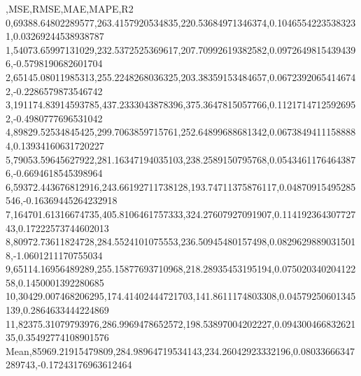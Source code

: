 ,MSE,RMSE,MAE,MAPE,R2
0,69388.64802289577,263.4157920534835,220.53684971346374,0.10465542235383231,0.03269244538938787
1,54073.65997131029,232.5372525369617,207.70992619382582,0.09726498154394396,-0.5798190682601704
2,65145.08011985313,255.2248268036325,203.38359153484657,0.06723920654146742,-0.2286579873546742
3,191174.83914593785,437.2333043878396,375.3647815057766,0.11217147125926952,-0.4980777696531042
4,89829.52534845425,299.7063859715761,252.64899688681342,0.06738494111588884,0.13934160631720227
5,79053.59645627922,281.16347194035103,238.2589150795768,0.05434611764643876,-0.6694618545398964
6,59372.443676812916,243.66192711738128,193.74711375876117,0.04870915495285546,-0.16369445264232918
7,164701.61316674735,405.8106461757333,324.27607927091907,0.11419236430772743,0.17222573744602013
8,80972.73611824728,284.5524101075553,236.50945480157498,0.08296298890315018,-1.0601211170755034
9,65114.16956489289,255.15877693710968,218.28935453195194,0.07502034020412258,0.1450001392280685
10,30429.007468206295,174.41402444721703,141.8611174803308,0.04579250601345139,0.2864633444224869
11,82375.31079793976,286.9969478652572,198.53897004202227,0.09430046683262135,0.35492774108901576
Mean,85969.21915479809,284.98964719534143,234.26042923332196,0.08033666347289743,-0.17243176963612464
